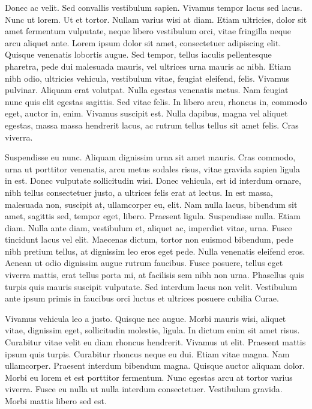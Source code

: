 \documentclass{article}
\begin{document}
Donec ac velit. Sed convallis vestibulum sapien. Vivamus tempor lacus sed
lacus. Nunc ut lorem. Ut et tortor. Nullam varius wisi at diam. Etiam
ultricies, dolor sit amet fermentum vulputate, neque libero vestibulum orci,
vitae fringilla neque arcu aliquet ante. Lorem ipsum dolor sit amet,
consectetuer adipiscing elit. Quisque venenatis lobortis augue. Sed tempor,
tellus iaculis pellentesque pharetra, pede dui malesuada mauris, vel ultrices
urna mauris ac nibh. Etiam nibh odio, ultricies vehicula, vestibulum vitae,
feugiat eleifend, felis. Vivamus pulvinar. Aliquam erat volutpat. Nulla egestas
venenatis metus. Nam feugiat nunc quis elit egestas sagittis. Sed vitae felis.
In libero arcu, rhoncus in, commodo eget, auctor in, enim. Vivamus suscipit
est. Nulla dapibus, magna vel aliquet egestas, massa massa hendrerit lacus, ac
rutrum tellus tellus sit amet felis. Cras viverra.

Suspendisse eu nunc. Aliquam dignissim urna sit amet mauris. Cras commodo, urna
ut porttitor venenatis, arcu metus sodales risus, vitae gravida sapien ligula
in est. Donec vulputate sollicitudin wisi. Donec vehicula, est id interdum
ornare, nibh tellus consectetuer justo, a ultrices felis erat at lectus. In est
massa, malesuada non, suscipit at, ullamcorper eu, elit. Nam nulla lacus,
bibendum sit amet, sagittis sed, tempor eget, libero. Praesent ligula.
Suspendisse nulla. Etiam diam. Nulla ante diam, vestibulum et, aliquet ac,
imperdiet vitae, urna. Fusce tincidunt lacus vel elit. Maecenas dictum, tortor
non euismod bibendum, pede nibh pretium tellus, at dignissim leo eros eget
pede. Nulla venenatis eleifend eros. Aenean ut odio dignissim augue rutrum
faucibus. Fusce posuere, tellus eget viverra mattis, erat tellus porta mi, at
facilisis sem nibh non urna. Phasellus quis turpis quis mauris suscipit
vulputate. Sed interdum lacus non velit. Vestibulum ante ipsum primis in
faucibus orci luctus et ultrices posuere cubilia Curae.

Vivamus vehicula leo a justo. Quisque nec augue. Morbi mauris wisi, aliquet
vitae, dignissim eget, sollicitudin molestie, ligula. In dictum enim sit amet
risus. Curabitur vitae velit eu diam rhoncus hendrerit. Vivamus ut elit.
Praesent mattis ipsum quis turpis. Curabitur rhoncus neque eu dui. Etiam vitae
magna. Nam ullamcorper. Praesent interdum bibendum magna. Quisque auctor
aliquam dolor. Morbi eu lorem et est porttitor fermentum. Nunc egestas arcu at
tortor varius viverra. Fusce eu nulla ut nulla interdum consectetuer.
Vestibulum gravida. Morbi mattis libero sed est.
\end{document}
